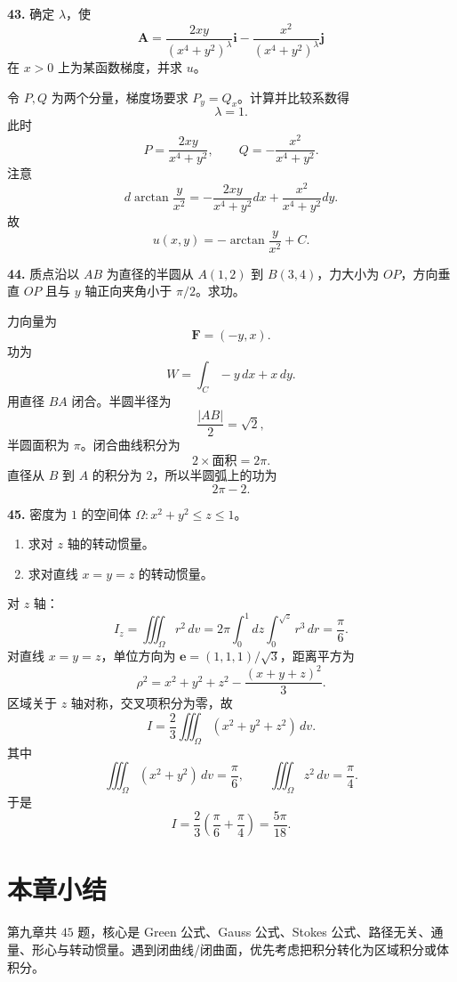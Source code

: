 \begin{problemblock}
\textbf{43.} 确定 \(\lambda\)，使
\[
\boldsymbol A=\frac{2xy}{(x^4+y^2)^\lambda}\boldsymbol i
-\frac{x^2}{(x^4+y^2)^\lambda}\boldsymbol j
\]
在 \(x>0\) 上为某函数梯度，并求 \(u\)。
\end{problemblock}
\begin{solutionblock}
令 \(P,Q\) 为两个分量，梯度场要求 \(P_y=Q_x\)。计算并比较系数得
\[
\lambda=1.
\]
此时
\[
P=\frac{2xy}{x^4+y^2},\qquad Q=-\frac{x^2}{x^4+y^2}.
\]
注意
\[
d\arctan\frac{y}{x^2}
=-\frac{2xy}{x^4+y^2}dx+\frac{x^2}{x^4+y^2}dy.
\]
故
\[
\boxed{u(x,y)=-\arctan\frac{y}{x^2}+C}.
\]
\end{solutionblock}

\begin{problemblock}
\textbf{44.} 质点沿以 \(AB\) 为直径的半圆从 \(A(1,2)\) 到 \(B(3,4)\)，力大小为 \(OP\)，方向垂直 \(OP\) 且与 \(y\) 轴正向夹角小于 \(\pi/2\)。求功。
\end{problemblock}
\begin{solutionblock}
力向量为
\[
\boldsymbol F=(-y,x).
\]
功为
\[
W=\int_C -y\,dx+x\,dy.
\]
用直径 \(BA\) 闭合。半圆半径为
\[
\frac{|AB|}{2}=\sqrt2,
\]
半圆面积为 \(\pi\)。闭合曲线积分为
\[
2\times\text{面积}=2\pi.
\]
直径从 \(B\) 到 \(A\) 的积分为 \(2\)，所以半圆弧上的功为
\[
\boxed{2\pi-2}.
\]
\end{solutionblock}

\begin{problemblock}
\textbf{45.} 密度为 \(1\) 的空间体 \(\Omega:x^2+y^2\le z\le1\)。
\begin{enumerate}
\item 求对 \(z\) 轴的转动惯量。
\item 求对直线 \(x=y=z\) 的转动惯量。
\end{enumerate}
\end{problemblock}
\begin{solutionblock}
对 \(z\) 轴：
\[
I_z=\iiint_\Omega r^2\,dv
=2\pi\int_0^1dz\int_0^{\sqrt z}r^3\,dr
=\boxed{\frac{\pi}{6}}.
\]
对直线 \(x=y=z\)，单位方向为 \(\boldsymbol e=(1,1,1)/\sqrt3\)，距离平方为
\[
\rho^2=x^2+y^2+z^2-\frac{(x+y+z)^2}{3}.
\]
区域关于 \(z\) 轴对称，交叉项积分为零，故
\[
I=\frac23\iiint_\Omega(x^2+y^2+z^2)\,dv.
\]
其中
\[
\iiint_\Omega(x^2+y^2)\,dv=\frac{\pi}{6},\qquad
\iiint_\Omega z^2\,dv=\frac{\pi}{4}.
\]
于是
\[
I=\frac23\left(\frac{\pi}{6}+\frac{\pi}{4}\right)
=\boxed{\frac{5\pi}{18}}.
\]
\end{solutionblock}

\section{本章小结}
第九章共 \(45\) 题，核心是 Green 公式、Gauss 公式、Stokes 公式、路径无关、通量、形心与转动惯量。遇到闭曲线/闭曲面，优先考虑把积分转化为区域积分或体积分。
